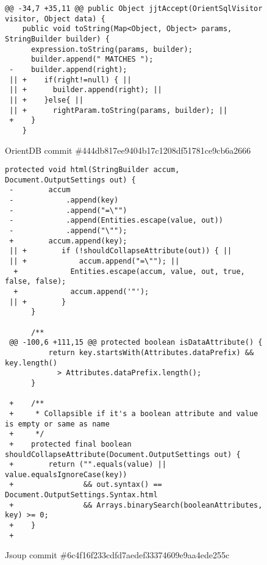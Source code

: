 \lstset{language=Java}

\begin{figure*}
\begin{lstlisting}[moredelim={[is][\color{red}]{||}{||}}]
@@ -34,7 +35,11 @@ public Object jjtAccept(OrientSqlVisitor visitor, Object data) {
    public void toString(Map<Object, Object> params, StringBuilder builder) {
      expression.toString(params, builder);
      builder.append(" MATCHES ");
 -    builder.append(right);
 || +    if(right!=null) { ||  
 || +      builder.append(right); ||
 || +    }else{ ||
 || +      rightParam.toString(params, builder); ||
 +    }
    }
\end{lstlisting}
\caption{OrientDB commit \#444db817ee9404b17c1208df51781ce9cb6a2666\label{fig:orient}}
\end{figure*}

\begin{figure*}
\begin{lstlisting}[moredelim={[is][\color{red}]{||}{||}}]
     protected void html(StringBuilder accum, Document.OutputSettings out) {
 -        accum
 -            .append(key)
 -            .append("=\"")
 -            .append(Entities.escape(value, out))
 -            .append("\"");
 +        accum.append(key);
 || +        if (!shouldCollapseAttribute(out)) { ||
 || +            accum.append("=\""); ||
  +            Entities.escape(accum, value, out, true, false, false);
  +            accum.append('"');
 || +        }
      }
  
      /**
 @@ -100,6 +111,15 @@ protected boolean isDataAttribute() {
          return key.startsWith(Attributes.dataPrefix) && key.length() 
            > Attributes.dataPrefix.length();
      }
  
 +    /**
 +     * Collapsible if it's a boolean attribute and value is empty or same as name
 +     */
 +    protected final boolean shouldCollapseAttribute(Document.OutputSettings out) {
 +        return ("".equals(value) || value.equalsIgnoreCase(key))
 +                && out.syntax() == Document.OutputSettings.Syntax.html
 +                && Arrays.binarySearch(booleanAttributes, key) >= 0;
 +    }
 +
 \end{lstlisting}
\caption{Jsoup commit \#6c4f16f233cdfd7aedef33374609e9aa4ede255c\label{fig:jsoup}}
\end{figure*}